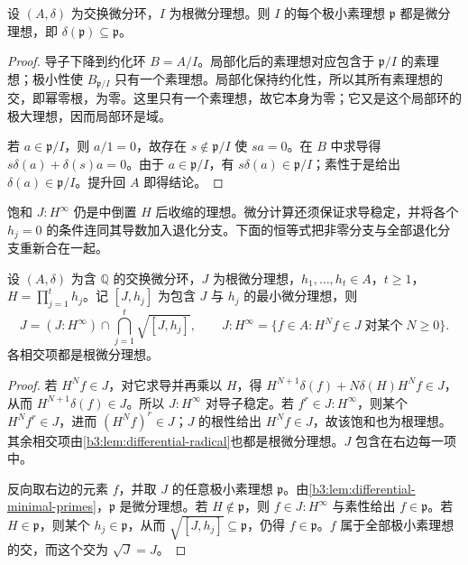 \begin{lemma}\label{b3:lem:differential-minimal-primes}
	设 \((A,\delta)\) 为交换微分环，\(I\) 为根微分理想。则 \(I\) 的每个极小素理想 \(\mathfrak p\) 都是微分理想，即 \(\delta(\mathfrak p)\subseteq\mathfrak p\)。
\end{lemma}
\begin{proof}
	导子下降到约化环 \(B=A/I\)。局部化后的素理想对应包含于 \(\mathfrak p/I\) 的素理想；极小性使 \(B_{\mathfrak p/I}\) 只有一个素理想。局部化保持约化性，所以其所有素理想的交，即幂零根，为零。这里只有一个素理想，故它本身为零；它又是这个局部环的极大理想，因而局部环是域。

	若 \(a\in\mathfrak p/I\)，则 \(a/1=0\)，故存在 \(s\notin\mathfrak p/I\) 使 \(sa=0\)。在 \(B\) 中求导得 \(s\delta(a)+\delta(s)a=0\)。由于 \(a\in\mathfrak p/I\)，有 \(s\delta(a)\in\mathfrak p/I\)；素性于是给出 \(\delta(a)\in\mathfrak p/I\)。提升回 \(A\) 即得结论。
\end{proof}

饱和 \(J:H^\infty\) 仍是中倒置 \(H\) 后收缩的理想。微分计算还须保证求导稳定，并将各个 \(h_j=0\) 的条件连同其导数加入退化分支。下面的恒等式把非零分支与全部退化分支重新合在一起。

\begin{proposition}\label{b3:prop:differential-branch-splitting}
	设 \((A,\delta)\) 为含 \(\mathbb Q\) 的交换微分环，\(J\) 为根微分理想，\(h_1,\ldots,h_t\in A\)，\(t\ge1\)，\(H=\prod_{j=1}^th_j\)。记 \([J,h_j]\) 为包含 \(J\) 与 \(h_j\) 的最小微分理想，则
	\[
		J=(J:H^\infty)\cap\bigcap_{j=1}^t\sqrt{[J,h_j]}, \qquad J:H^\infty=\{f\in A:H^Nf\in J\;\text{对某个}\;N\ge0\}.
	\]
	各相交项都是根微分理想。
\end{proposition}
\begin{proof}
	若 \(H^Nf\in J\)，对它求导并再乘以 \(H\)，得 \(H^{N+1}\delta(f)+N\delta(H)H^Nf\in J\)，从而 \(H^{N+1}\delta(f)\in J\)。所以 \(J:H^\infty\) 对导子稳定。若 \(f^r\in J:H^\infty\)，则某个 \(H^Nf^r\in J\)，进而 \((H^Nf)^r\in J\)；\(J\) 的根性给出 \(H^Nf\in J\)，故该饱和也为根理想。其余相交项由\cref{b3:lem:differential-radical}也都是根微分理想。\(J\) 包含在右边每一项中。

	反向取右边的元素 \(f\)，并取 \(J\) 的任意极小素理想 \(\mathfrak p\)。由\cref{b3:lem:differential-minimal-primes}，\(\mathfrak p\) 是微分理想。若 \(H\notin\mathfrak p\)，则 \(f\in J:H^\infty\) 与素性给出 \(f\in\mathfrak p\)。若 \(H\in\mathfrak p\)，则某个 \(h_j\in\mathfrak p\)，从而 \(\sqrt{[J,h_j]}\subseteq\mathfrak p\)，仍得 \(f\in\mathfrak p\)。\(f\) 属于全部极小素理想的交，而这个交为 \(\sqrt J=J\)。
\end{proof}


